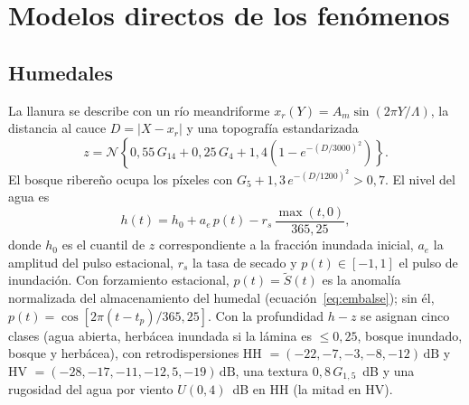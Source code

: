 \documentclass[11pt,a4paper]{article}
\newcommand{\dB}{\,\mathrm{dB}}
\begin{document}
\section{Modelos directos de los fenómenos}

\subsection{Humedales}
La llanura se describe con un río meandriforme $x_r(Y) = A_m\sin(2\pi Y/\Lambda)$, la distancia al cauce
$D = |X - x_r|$ y una topografía estandarizada
\begin{equation}
  z = \mathcal N\!\left\{0{,}55\,G_{14} + 0{,}25\,G_4 + 1{,}4\left(1 - e^{-(D/3000)^2}\right)\right\}.
\end{equation}
El bosque ribereño ocupa los píxeles con $G_5 + 1{,}3\,e^{-(D/1200)^2} > 0{,}7$. El nivel del agua es
\begin{equation}\label{eq:nivel}
  h(t) = h_0 + a_e\,p(t) - r_s\,\frac{\max(t,0)}{365{,}25},
\end{equation}
donde $h_0$ es el cuantil de $z$ correspondiente a la fracción inundada inicial, $a_e$ la amplitud del
pulso estacional, $r_s$ la tasa de secado y $p(t)\in[-1,1]$ el pulso de inundación. Con forzamiento
estacional, $p(t) = \tilde S(t)$ es la anomalía normalizada del almacenamiento del humedal
(ecuación~\ref{eq:embalse}); sin él, $p(t)=\cos[2\pi(t-t_p)/365{,}25]$. Con la profundidad $h - z$ se
asignan cinco clases (agua abierta, herbácea inundada si la lámina es $\le 0{,}25$, bosque inundado, bosque
y herbácea), con retrodispersiones HH $= (-22, -7, -3, -8, -12)\dB$ y HV $= (-28, -17, -11, -12{,}5, -19)\dB$,
una textura $0{,}8\,G_{1,5}$~dB y una rugosidad del agua por viento $U(0,4)$~dB en HH (la mitad en HV).
\end{document}
